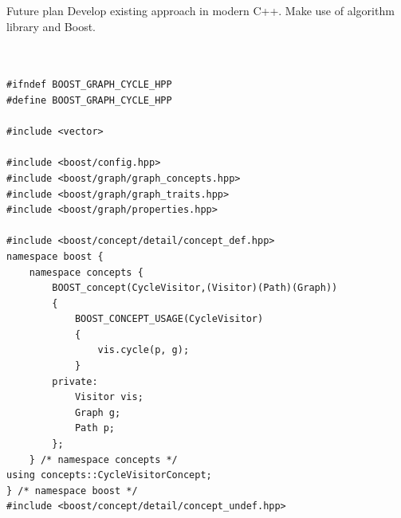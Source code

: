 \documentclass[xcolor=dvipsnames]{beamer}
\begin{document}
\begin{frame}[fragile,shrink=30]{Future plan}
	Develop existing approach in modern C++. Make use of algorithm library and Boost.

\begin{verbatim}


#ifndef BOOST_GRAPH_CYCLE_HPP
#define BOOST_GRAPH_CYCLE_HPP

#include <vector>

#include <boost/config.hpp>
#include <boost/graph/graph_concepts.hpp>
#include <boost/graph/graph_traits.hpp>
#include <boost/graph/properties.hpp>

#include <boost/concept/detail/concept_def.hpp>
namespace boost {
    namespace concepts {
        BOOST_concept(CycleVisitor,(Visitor)(Path)(Graph))
        {
            BOOST_CONCEPT_USAGE(CycleVisitor)
            {
                vis.cycle(p, g);
            }
        private:
            Visitor vis;
            Graph g;
            Path p;
        };
    } /* namespace concepts */
using concepts::CycleVisitorConcept;
} /* namespace boost */
#include <boost/concept/detail/concept_undef.hpp>
\end{verbatim}
\end{frame}
\end{document}
